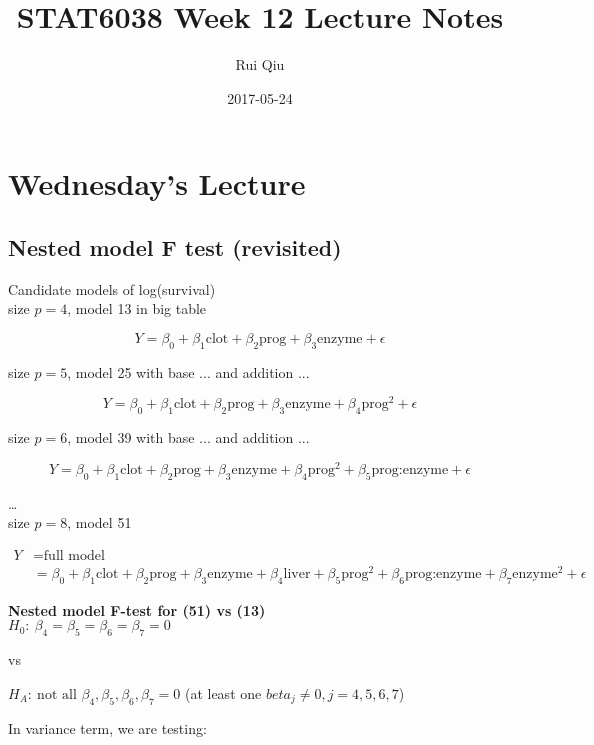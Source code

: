 \documentclass[a4paper, 11pt, twoside]{article}
\begin{document}
\title{STAT6038 Week 12 Lecture Notes}
\author{Rui Qiu}
\date{2017-05-24}

\maketitle

\section{Wednesday's Lecture}
\subsection{Nested model F test (revisited)}

Candidate models of log(survival)\\

size $p=4$, model 13 in big table

\[Y=\beta_0+\beta_1\text{clot}+\beta_2\text{prog}+\beta_3\text{enzyme} + \epsilon\]

size $p=5$, model 25 with base ... and addition ...

\[Y=\beta_0+\beta_1\text{clot}+\beta_2\text{prog}+\beta_3\text{enzyme} +\beta_4\text{prog}^2+\epsilon\]

size $p=6$, model 39 with base ... and addition ...

\[Y=\beta_0+\beta_1\text{clot}+\beta_2\text{prog}+\beta_3\text{enzyme}+\beta_4\text{prog}^2+\beta_5\text{prog:enzyme} + \epsilon\]

\dots\\

size $p=8$, model 51

\[\begin{split}
Y&= \text{full model}\\
&=\beta_0+\beta_1\text{clot}+\beta_2\text{prog}+\beta_3\text{enzyme} + \beta_4\text{liver}+\beta_5\text{prog}^2+\beta_6\text{prog:enzyme} + \beta_7 \text{enzyme}^2 + \epsilon
\end{split}
\]

\textbf{Nested model F-test for (51) vs (13)}\\

$H_0:\ \beta_4=\beta_5=\beta_6=\beta_7=0$

vs

$H_A:\ \text{not all }\beta_4, \beta_5, \beta_6, \beta_7 = 0$ (at least one $beta_j\not=0, j=4, 5, 6, 7$)

In variance term, we are testing:
\end{document}
